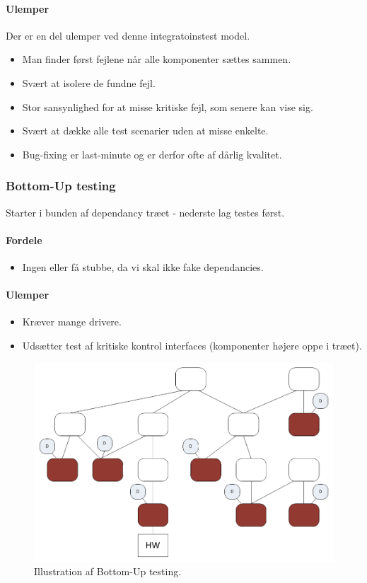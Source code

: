 \paragraph{Ulemper}
Der er en del ulemper ved denne integratoinstest model.

\begin{itemize}
	\item Man finder først fejlene når alle komponenter sættes sammen.
	\item Svært at isolere de fundne fejl.
	\item Stor sansynlighed for at misse kritiske fejl, som senere kan vise sig.
	\item Svært at dække alle test scenarier uden at misse enkelte.
	\item Bug-fixing er last-minute og er derfor ofte af dårlig kvalitet.
\end{itemize}


\subsubsection{Bottom-Up testing}
Starter i bunden af dependancy træet - nederste lag testes først.

\paragraph{Fordele}

\begin{itemize}
	\item Ingen eller få stubbe, da vi skal ikke fake dependancies.
\end{itemize}

\paragraph{Ulemper}

\begin{itemize}
	\item Kræver mange drivere.
	\item Udsætter test af kritiske kontrol interfaces (komponenter højere oppe i træet).
\end{itemize}

\begin{figure}[H]
	\centering
	\includegraphics[width=0.5\linewidth]{figs/bottomUp.PNG}
	\caption{Illustration af Bottom-Up testing.}
	\label{fig:bottomUp}
\end{figure}

